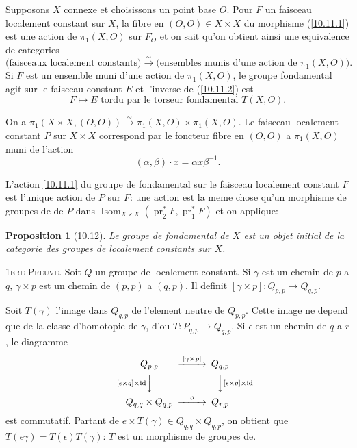 \documentclass[12pt,a4paper]{article}
\theoremstyle{plain}
\newtheorem{proposition}[theorem]{Proposition}
\theoremstyle{definition}
\theoremstyle{remark}
\DeclareMathOperator{\Isom}{Isom}
\DeclareMathOperator{\pr}{pr}
\DeclareMathOperator{\id}{id}
\begin{document}
Supposons $X$ connexe et choisissons un point base $O$. Pour $F$ un faisceau localement constant sur $X$, la fibre en $(O,O) \in X \times X$ du morphisme (\ref{10.11.1}) est une action de $\pi_1(X,O)$ sur $F_O$ et on sait qu'on obtient ainsi une equivalence de categories
\begin{equation}\label{10.11.2}
\text{(faisceaux localement constants)} \xrightarrow{\sim} \text{(ensembles munis d'une action de } \pi_1(X,O)\text{)}. \tag{10.11.2}
\end{equation}
Si $F$ est un ensemble muni d'une action de $\pi_1(X,O)$, le groupe fondamental agit sur le faisceau constant $E$ et l'inverse de (\ref{10.11.2}) est
$$F \longmapsto E \text{ tordu par le torseur fondamental } T(X,O).$$

On a $\pi_1(X \times X, (O,O)) \xrightarrow{\sim} \pi_1(X,O) \times \pi_1(X,O)$. Le faisceau localement constant $P$ sur $X \times X$ correspond par le foncteur fibre en $(O,O)$ a $\pi_1(X,O)$ muni de l'action
$$(\alpha, \beta)\cdot x = \alpha x \beta^{-1}.$$

L'action \ref{10.11.1} du groupe de fondamental sur le faisceau localement constant $F$ est l'unique action de $P$ sur $F$: une action est la meme chose qu'un morphisme de groupes de de $P$ dans $\Isom_{X \times X}(\pr_2^* F, \pr_1^* F)$ et on applique:

\begin{proposition}[10.12]
Le groupe de fondamental de $X$ est un objet initial de la categorie des groupes de localement constants sur $X$.
\end{proposition}

\textsc{1ere Preuve.} Soit $Q$ un groupe de localement constant. Si $\gamma$ est un chemin de $p$ a $q$, $\gamma \times p$ est un chemin de $(p,p)$ a $(q,p)$. Il definit $[\gamma \times p]: Q_{p,p} \to Q_{q,p}$.

Soit $T(\gamma)$ l'image dans $Q_{q,p}$ de l'element neutre de $Q_{p,p}$. Cette image ne depend que de la classe d'homotopie de $\gamma$, d'ou $T: P_{q,p} \to Q_{q,p}$. Si $\epsilon$ est un chemin de $q$ a $r$, le diagramme
$$\begin{CD}
Q_{p,p} @>{[\gamma \times p]}>> Q_{q,p} \\
@V{[\epsilon \times q] \times \id}VV @VV{[\epsilon \times q] \times \id}V \\
Q_{q,q} \times Q_{q,p} @>{o}>> Q_{r,p}
\end{CD}$$
est commutatif. Partant de $e \times T(\gamma) \in Q_{q,q} \times Q_{q,p}$, on obtient que $T(\epsilon \gamma) = T(\epsilon) T(\gamma)$: $T$ est un morphisme de groupes de.
\end{document}
